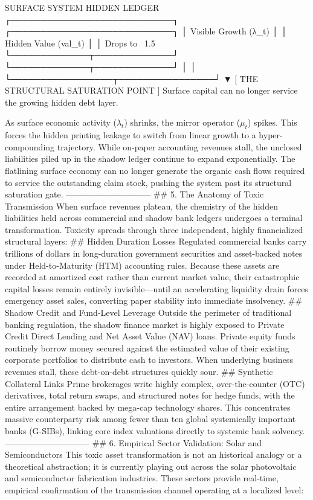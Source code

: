                   SURFACE SYSTEM                     HIDDEN LEDGER
          ┌───────────────────────────┐      ┌───────────────────────────┐
          │  Visible Growth (λ_t)      │      │  Hidden Value (val_t)     │
          │  Drops to ~1.5%
          └─────────────┬─────────────┘      └─────────────┬─────────────┘
                        │                                  │
                        └─────────────────┬────────────────┘
                                          ▼
                         [ THE STRUCTURAL SATURATION POINT ]
                         Surface capital can no longer service
                         the growing hidden debt layer.

As surface economic activity ($\lambda_t$) shrinks, the mirror operator ($\mu_t$) spikes. This forces the hidden printing leakage to switch from linear growth to a hyper-compounding trajectory. While on-paper accounting revenues stall, the unclosed liabilities piled up in the shadow ledger continue to expand exponentially.
The flatlining surface economy can no longer generate the organic cash flows required to service the outstanding claim stock, pushing the system past its structural saturation gate.
------------------------------
## 5. The Anatomy of Toxic Transmission
When surface revenues plateau, the chemistry of the hidden liabilities held across commercial and shadow bank ledgers undergoes a terminal transformation. Toxicity spreads through three independent, highly financialized structural layers:
## Hidden Duration Losses
Regulated commercial banks carry trillions of dollars in long-duration government securities and asset-backed notes under Held-to-Maturity (HTM) accounting rules. Because these assets are recorded at amortized cost rather than current market value, their catastrophic capital losses remain entirely invisible—until an accelerating liquidity drain forces emergency asset sales, converting paper stability into immediate insolvency.
## Shadow Credit and Fund-Level Leverage
Outside the perimeter of traditional banking regulation, the shadow finance market is highly exposed to Private Credit Direct Lending and Net Asset Value (NAV) loans. Private equity funds routinely borrow money secured against the estimated value of their existing corporate portfolios to distribute cash to investors. When underlying business revenues stall, these debt-on-debt structures quickly sour.
## Synthetic Collateral Links
Prime brokerages write highly complex, over-the-counter (OTC) derivatives, total return swaps, and structured notes for hedge funds, with the entire arrangement backed by mega-cap technology shares. This concentrates massive counterparty risk among fewer than ten global systemically important banks (G-SIBs), linking core index valuations directly to systemic bank solvency.
------------------------------
## 6. Empirical Sector Validation: Solar and Semiconductors
This toxic asset transformation is not an historical analogy or a theoretical abstraction; it is currently playing out across the solar photovoltaic and semiconductor fabrication industries. These sectors provide real-time, empirical confirmation of the transmission channel operating at a localized level:

